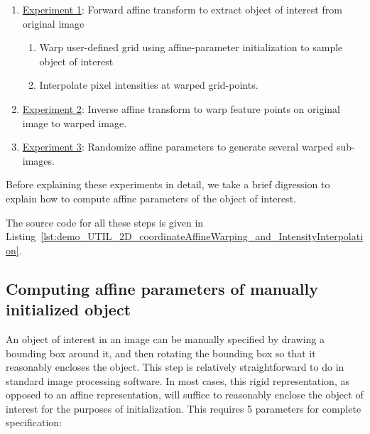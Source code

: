 \begin{enumerate}
\item \underline{Experiment 1}: Forward affine transform to extract object of interest from original image
\begin{enumerate}
\item Warp user-defined grid using affine-parameter initialization to sample object of interest
\item Interpolate pixel intensities at warped grid-points.
\end{enumerate}
\item \underline{Experiment 2}: Inverse affine transform to warp feature points on original image to warped image.
\item \underline{Experiment 3}: Randomize affine parameters to generate several warped sub-images.
\end{enumerate}


Before explaining these experiments in detail, we take a brief digression to explain how to compute affine parameters of the object of interest.

The source code for all these steps is given in Listing~\ref{lst:demo_UTIL_2D_coordinateAffineWarping_and_IntensityInterpolation}.

\subsection{Computing affine parameters of manually initialized object}

An object of interest in an image can be manually specified by drawing a bounding box around it, and then rotating the bounding box so that it reasonably encloses the object.  This step is relatively straightforward to do in standard image processing software.  In most cases, this rigid representation, as opposed to an affine representation, will suffice to reasonably enclose the object of interest for the purposes of initialization.  This requires 5 parameters for complete specification:

